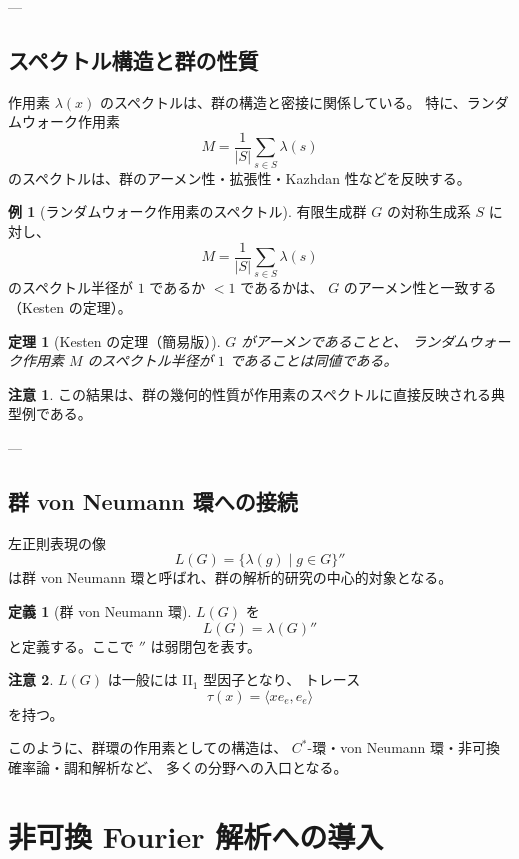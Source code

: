 \documentclass[12pt,a4paper]{ltjarticle}
\newtheorem*{theorem}{定理}
\theoremstyle{definition}
\newtheorem*{definition}{定義}
\newtheorem*{remark}{注意}
\newtheorem*{example}{例}
\begin{document}
---

\subsection{スペクトル構造と群の性質}

作用素 $\lambda(x)$ のスペクトルは、群の構造と密接に関係している。
特に、ランダムウォーク作用素
\[
M=\frac{1}{|S|}\sum_{s\in S}\lambda(s)
\]
のスペクトルは、群のアーメン性・拡張性・Kazhdan 性などを反映する。

\begin{example}[ランダムウォーク作用素のスペクトル]
有限生成群 $G$ の対称生成系 $S$ に対し、
\[
M=\frac{1}{|S|}\sum_{s\in S}\lambda(s)
\]
のスペクトル半径が $1$ であるか $<1$ であるかは、
$G$ のアーメン性と一致する（Kesten の定理）。
\end{example}

\begin{theorem}[Kesten の定理（簡易版）]
$G$ がアーメンであることと、
ランダムウォーク作用素 $M$ のスペクトル半径が $1$ であることは同値である。
\end{theorem}

\begin{remark}
この結果は、群の幾何的性質が作用素のスペクトルに直接反映される典型例である。
\end{remark}

---

\subsection{群 von Neumann 環への接続}

左正則表現の像
\[
L(G)=\{\lambda(g)\mid g\in G\}''
\]
は群 von Neumann 環と呼ばれ、群の解析的研究の中心的対象となる。

\begin{definition}[群 von Neumann 環]
$L(G)$ を
\[
L(G)=\lambda(G)''
\]
と定義する。ここで $''$ は弱閉包を表す。
\end{definition}

\begin{remark}
$L(G)$ は一般には II$_1$ 型因子となり、
トレース
\[
\tau(x)=\langle x e_e, e_e\rangle
\]
を持つ。
\end{remark}

このように、群環の作用素としての構造は、
$C^*$-環・von Neumann 環・非可換確率論・調和解析など、
多くの分野への入口となる。

\section{非可換 Fourier 解析への導入}
\end{document}
